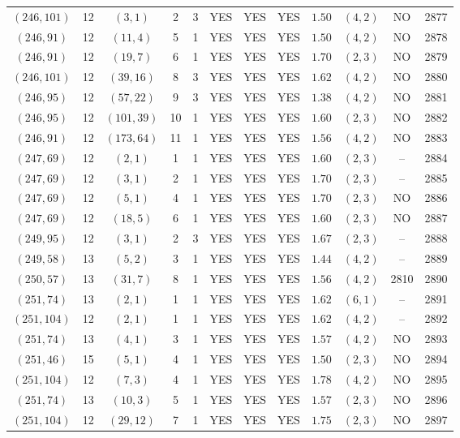 \begin{longtable}{|c|c|c|c|c|c|c|c|c|c|c|c|}
$(246,101)$ & 12 & $(3,1)$ & 2 & 3 & YES & YES & YES & $1.50$ & $(4,2)$ & NO & 2877\\
$(246,91)$ & 12 & $(11,4)$ & 5 & 1 & YES & YES & YES & $1.50$ & $(4,2)$ & NO & 2878\\
$(246,91)$ & 12 & $(19,7)$ & 6 & 1 & YES & YES & YES & $1.70$ & $(2,3)$ & NO & 2879\\
$(246,101)$ & 12 & $(39,16)$ & 8 & 3 & YES & YES & YES & $1.62$ & $(4,2)$ & NO & 2880\\
$(246,95)$ & 12 & $(57,22)$ & 9 & 3 & YES & YES & YES & $1.38$ & $(4,2)$ & NO & 2881\\
$(246,95)$ & 12 & $(101,39)$ & 10 & 1 & YES & YES & YES & $1.60$ & $(2,3)$ & NO & 2882\\
$(246,91)$ & 12 & $(173,64)$ & 11 & 1 & YES & YES & YES & $1.56$ & $(4,2)$ & NO & 2883\\
$(247,69)$ & 12 & $(2,1)$ & 1 & 1 & YES & YES & YES & $1.60$ & $(2,3)$ & -- & 2884\\
$(247,69)$ & 12 & $(3,1)$ & 2 & 1 & YES & YES & YES & $1.70$ & $(2,3)$ & -- & 2885\\
$(247,69)$ & 12 & $(5,1)$ & 4 & 1 & YES & YES & YES & $1.70$ & $(2,3)$ & NO & 2886\\
$(247,69)$ & 12 & $(18,5)$ & 6 & 1 & YES & YES & YES & $1.60$ & $(2,3)$ & NO & 2887\\
$(249,95)$ & 12 & $(3,1)$ & 2 & 3 & YES & YES & YES & $1.67$ & $(2,3)$ & -- & 2888\\
$(249,58)$ & 13 & $(5,2)$ & 3 & 1 & YES & YES & YES & $1.44$ & $(4,2)$ & -- & 2889\\
$(250,57)$ & 13 & $(31,7)$ & 8 & 1 & YES & YES & YES & $1.56$ & $(4,2)$ & 2810 & 2890\\
$(251,74)$ & 13 & $(2,1)$ & 1 & 1 & YES & YES & YES & $1.62$ & $(6,1)$ & -- & 2891\\
$(251,104)$ & 12 & $(2,1)$ & 1 & 1 & YES & YES & YES & $1.62$ & $(4,2)$ & -- & 2892\\
$(251,74)$ & 13 & $(4,1)$ & 3 & 1 & YES & YES & YES & $1.57$ & $(4,2)$ & NO & 2893\\
$(251,46)$ & 15 & $(5,1)$ & 4 & 1 & YES & YES & YES & $1.50$ & $(2,3)$ & NO & 2894\\
$(251,104)$ & 12 & $(7,3)$ & 4 & 1 & YES & YES & YES & $1.78$ & $(4,2)$ & NO & 2895\\
$(251,74)$ & 13 & $(10,3)$ & 5 & 1 & YES & YES & YES & $1.57$ & $(2,3)$ & NO & 2896\\
$(251,104)$ & 12 & $(29,12)$ & 7 & 1 & YES & YES & YES & $1.75$ & $(2,3)$ & NO & 2897\\

\end{longtable}
